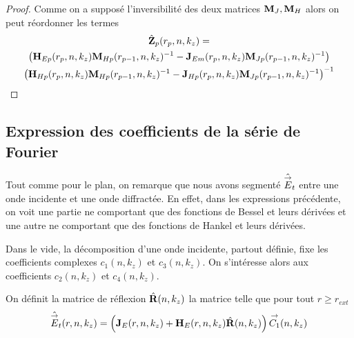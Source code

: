 \begin{proof}
      Comme on a supposé l'inversibilité des deux matrices \(\mathbf{M}_J, \mathbf{M}_H\) alors on peut réordonner les termes
      \begin{multline}
        \hat{\mathbf{Z}}_{p}(r_p,n,k_z) =\\
          \left(\mathbf{H}_{Ep}(r_p,n,k_z)\mathbf{M}_{Hp}(r_{p-1},n,k_z)^{-1} - \mathbf{J}_{Em}(r_p,n,k_z)\mathbf{M}_{Jp}(r_{p-1},n,k_z)^{-1}\right) \\
          \left(\mathbf{H}_{Hp}(r_p,n,k_z)\mathbf{M}_{Hp}(r_{p-1},n,k_z)^{-1} - \mathbf{J}_{Hp}(r_p,n,k_z)\mathbf{M}_{Jp}(r_{p-1},n,k_z)^{-1}\right)^{-1}
      \end{multline}

    \end{proof}


  \subsection{Expression des coefficients de la série de Fourier}

    Tout comme pour le plan, on remarque que nous avons segmenté \(\hat{{\overset{\rightarrow}{E}}}_t\) entre une onde incidente et une onde diffractée. En effet, dans les expressions précédente, on voit une partie ne comportant que des fonctions de Bessel et leurs dérivées et une autre ne comportant que des fonctions de Hankel et leurs dérivées.

    Dans le vide, la décomposition d'une onde incidente, partout définie, fixe les coefficients complexes \(c_1(n,k_z)\) et \(c_3(n,k_z)\). On s'intéresse alors aux coefficients \(c_2(n,k_z)\) et \(c_4(n,k_z)\).

    \begin{defn}
      On définit la matrice de réflexion \(\hat{\mathbf{R}}(n,k_z)\) la matrice telle que pour tout \(r\ge r_{ext}\)
      \begin{equation*}
        \hat{{\overset{\rightarrow}{E}}}_t(r,n,k_z) = \left(\mathbf{J}_E(r,n,k_z) + \mathbf{H}_E(r,n,k_z)\hat{\mathbf{R}}(n,k_z) \right){\overset{\rightarrow}{C_1}}(n,k_z)
      \end{equation*}
    \end{defn}

